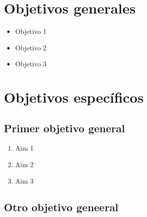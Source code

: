 \section{Objetivos generales}\label{sec:objetivos-generales}

\begin{itemize}

  \item Objetivo 1
 
  \item Objetivo 2

  \item Objetivo 3
 
\end{itemize}

\section{Objetivos específicos}\label{sec:objetivos-especificos}


\subsection{Primer objetivo general}

 
  \begin{enumerate}
    \item Aim 1 
    \item Aim 2
    \item Aim 3
  \end{enumerate}

\subsection{Otro objetivo geneeral}

